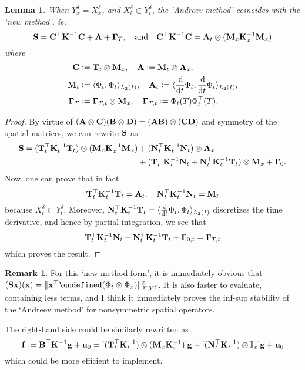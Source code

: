 \documentclass[11pt,a4paper]{amsart}
\newtheorem{lemma}{Lemma}
\theoremstyle{definition}
\newtheorem*{remark}{Remark}
\newcommand{\kron}{\otimes}
\let\Vec\undefined
\DeclareMathOperator*{\Vec}{Vec}
\begin{document}
\begin{lemma}
  When $Y^\delta_x = X^\delta_x$, and $X^\delta_t \subset Y^\delta_t$, the `Andreev method' coincides with the `new method', ie,
  \[
    {\bf S} = {\bf C}^{\top} {\bf K}^{-1} {\bf C} + {\bf A} + {\bf \Gamma}_T, \quad \text{and} \quad {\bf C}^{\top} {\bf K}^{-1} {\bf C} = {\bf A}_t \kron ({\bf M}_x {\bf K}_x^{-1} {\bf M}_x)
  \]
  where
  \begin{align*}
    {\bf C} &:= {\bf T}_t \kron {\bf M}_x, \quad {\bf A} := {\bf M}_t \kron {\bf A}_x, \\
    {\bf M}_t &:= \langle \Phi_t, \Phi_t \rangle_{L_2(I)}, \quad {\bf A}_t := \langle \frac{\dif}{\dif t} \Phi_t, \frac{\dif}{\dif t} \Phi_t \rangle_{L_2(I)}, \\
    {\bf \Gamma}_T &:= {\bf \Gamma}_{T,t} \kron {\bf M}_x, \quad {\bf \Gamma}_{T,t} := \Phi_t(T) \Phi_t^\top(T).
  \end{align*}
\end{lemma}
\begin{proof}
By virtue of $({\bf A} \kron {\bf C}) ({\bf B} \kron {\bf D}) = ({\bf A} {\bf B}) \kron ({\bf C} {\bf D})$ and symmetry of the spatial matrices, we can rewrite ${\bf S}$ as
  \begin{align*}
    {\bf S} = ({\bf T}_t^\top {\bf K}_t^{-1} {\bf T}_t) \kron ({\bf M}_x {\bf K}_x^{-1} {\bf M}_x) &+ ({\bf N}_t^\top {\bf K}_t^{-1} {\bf N}_t) \kron {\bf A}_x \\
    &+ ({\bf T}_t^\top {\bf K}_t^{-1} {\bf N}_t + {\bf N}_t^\top {\bf K}_t^{-1} {\bf T}_t) \kron {\bf M}_x + {\bf \Gamma}_0.
  \end{align*}
  Now, one can prove that in fact
  \[
    {\bf T}_t^\top {\bf K}_t^{-1} {\bf T}_t = {\bf A}_t, \quad {\bf N}_t^\top {\bf K}_t^{-1} {\bf N}_t = {\bf M}_t
  \]
  because $X_t^\delta \subset Y_t^\delta$. Moreover, ${\bf N}_t^\top {\bf K}_t^{-1} {\bf T}_t = \langle \frac{\dif}{\dif t} \Phi_t, \Phi_t \rangle_{L_2(I)}$ discretizes the time derivative, and hence by partial integration, we see that
  \[
    {\bf T}_t^\top {\bf K}_t^{-1} {\bf N}_t + {\bf N}_t^\top {\bf K}_t^{-1} {\bf T}_t + {\bf \Gamma}_{0,t} = {\bf \Gamma}_{T,t}
  \]
  which proves the result.
\end{proof}
\begin{remark}
  For this `new method form', it is immediately obvious that $({\bf S}{\bf x})({\bf x}) = \|{\bf x}^\top \Vec(\Phi_t \kron \Phi_x)\|^2_{X,Y^\delta}$. It is also faster to evaluate, containing less terms, and I think it immediately proves the inf-sup stability of the `Andreev method' for nonsymmetric spatial operators.

The right-hand side could be similarly rewritten as
  \[
    {\bf f} := {\bf B}^\top {\bf K}^{-1} {\bf g} + {\bf u}_0 = [({\bf T}_t^\top {\bf K}_t^{-1}) \kron ({\bf M}_x {\bf K}_x^{-1})] {\bf g} + [({\bf N}_t^\top {\bf K}_t^{-1}) \kron {\bf I}_x] {\bf g} + {\bf u}_0
  \]
  which could be more efficient to implement.
\end{remark}
\end{document}
